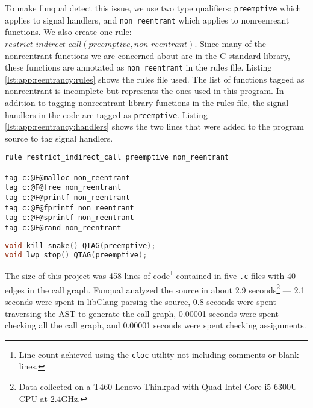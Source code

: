 To make funqual detect this issue, we use two type qualifiers: \lstinline{preemptive} which applies to signal handlers, and \lstinline{non_reentrant} which applies to nonreenreant functions.  We also create one rule: $restrict\_indirect\_call(preemptive, non\_reentrant)$.  Since many of the nonreentrant functions we are concerned about are in the C standard library, these functions are annotated as \lstinline{non_reentrant} in the rules file.  Listing \ref{lst:app:reentrancy:rules} shows the rules file used.  The list of functions tagged as nonreentrant is incomplete but represents the ones used in this program.  In addition to tagging nonreentrant library functions in the rules file, the signal handlers in the code are tagged as \lstinline{preemptive}.  Listing \ref{lst:app:reentrancy:handlers} shows the two lines that were added to the program source to tag signal handlers.  

\noindent\begin{minipage}[t]{\linewidth}
\begin{lstlisting}[caption={Rules file for preventing preemptive functions from calling non\_reentrant functions.  Since this rules file contains no references to project-specific functions, the file could concievably be re-used by several projects.},label={lst:app:reentrancy:rules}]
rule restrict_indirect_call preemptive non_reentrant

tag c:@F@malloc non_reentrant
tag c:@F@free non_reentrant
tag c:@F@printf non_reentrant
tag c:@F@fprintf non_reentrant
tag c:@F@sprintf non_reentrant
tag c:@F@rand non_reentrant
\end{lstlisting}
\end{minipage}

\noindent\begin{minipage}[t]{\linewidth}
\begin{lstlisting}[language=c,caption={Lines inserted into C file to mark signal handlers as preemptive.},label={lst:app:reentrancy:handlers}]
void kill_snake() QTAG(preemptive);
void lwp_stop() QTAG(preemptive);
\end{lstlisting}
\end{minipage}

The size of this project was 458 lines of code\footnote{Line count achieved using the \lstinline{cloc} utility not including comments or blank lines.} contained in five \lstinline{.c} files with 40 edges in the call graph.  Funqual analyzed the source in about 2.9 seconds\footnote{Data collected on a T460 Lenovo Thinkpad with Quad Intel Core i5-6300U CPU at 2.4GHz.} --- 2.1 seconds were spent in libClang parsing the source, 0.8 seconds were spent traversing the AST to generate the call graph, 0.00001 seconds were spent checking all the call graph, and 0.00001 seconds were spent checking assignments. 

